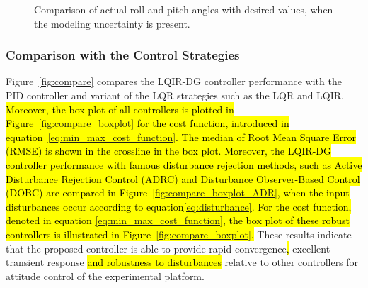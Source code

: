 \documentclass[3p]{elsarticle}
\begin{document}
\begin{figure}[H]
    \caption{Comparison of actual roll and pitch angles with desired values, when the modeling uncertainty is present.}
    \label{fig:weight}
\end{figure}
\subsubsection{Comparison with the Control Strategies}
\noindent Figure~\ref{fig:compare} compares the LQIR-DG controller performance with the PID controller and variant of the LQR strategies such as the LQR and LQIR. 
\hl{Moreover, the box plot of all controllers is plotted in Figure~{\ref{fig:compare_boxplot}} for the cost function, introduced in equation~{\eqref{eq:min_max_cost_function}}. %
The median of Root Mean Square Error (RMSE) is shown in the crossline in the box plot.
Moreover, the LQIR-DG controller performance with famous disturbance rejection methods, such as Active Disturbance Rejection Control (ADRC) {\cite{CHENG2023}} and Disturbance Observer-Based Control (DOBC) {\cite{AGHAYAN202320}} are compared in Figure~{\ref{fig:compare_boxplot_ADR}}, when the input disturbances occur according to equation{\eqref{eq:disturbance}}. For the cost function, denoted in equation {\eqref{eq:min_max_cost_function}}, the box plot of these robust controllers is illustrated in Figure~{\ref{fig:compare_boxplot}}. }
These results indicate that the proposed controller is able to provide rapid convergence\hl{,} excellent transient response \hl{and robustness to disturbances} relative to other controllers for attitude control of the experimental platform.
\end{document}
